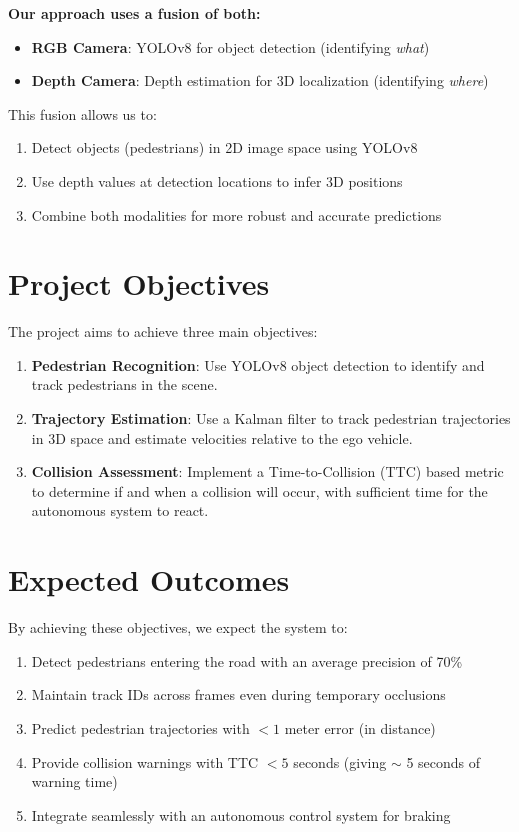 \textbf{Our approach uses a fusion of both:}
\begin{itemize}
    \item \textbf{RGB Camera}: YOLOv8 for object detection (identifying \textit{what})
    \item \textbf{Depth Camera}: Depth estimation for 3D localization (identifying \textit{where})
\end{itemize}

This fusion allows us to:
\begin{enumerate}
    \item Detect objects (pedestrians) in 2D image space using YOLOv8
    \item Use depth values at detection locations to infer 3D positions
    \item Combine both modalities for more robust and accurate predictions
\end{enumerate}

\section{Project Objectives}

The project aims to achieve three main objectives:

\begin{enumerate}
    \item \textbf{Pedestrian Recognition}: Use YOLOv8 object detection to identify and track pedestrians in the scene.
    
    \item \textbf{Trajectory Estimation}: Use a Kalman filter to track pedestrian trajectories in 3D space and estimate velocities relative to the ego vehicle.
    
    \item \textbf{Collision Assessment}: Implement a Time-to-Collision (TTC) based metric to determine if and when a collision will occur, with sufficient time for the autonomous system to react.
\end{enumerate}

\section{Expected Outcomes}

By achieving these objectives, we expect the system to:
\begin{enumerate}
    \item Detect pedestrians entering the road with an average precision of 70\%
    \item Maintain track IDs across frames even during temporary occlusions
    \item Predict pedestrian trajectories with $ < 1 $ meter error (in distance)
    \item Provide collision warnings with TTC  $ < 5$ seconds (giving $ \sim $ 5 seconds of warning time)
    \item Integrate seamlessly with an autonomous control system for braking
\end{enumerate}

